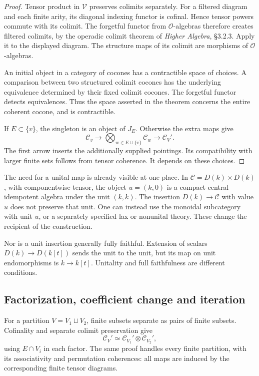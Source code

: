 \begin{proof}
Tensor product in \(\mathcal V\) preserves colimits separately.
For a filtered diagram and each finite arity, its diagonal indexing
functor is cofinal. Hence tensor powers commute with its colimit.
The forgetful functor from \(\mathcal O\)-algebras therefore creates
filtered colimits, by the operadic colimit theorem
of \emph{Higher Algebra}, \S3.2.3.
Apply it to the displayed diagram. The structure maps of its colimit
are morphisms of \(\mathcal O\)-algebras.

An initial object in a category of cocones has a contractible space
of choices. A comparison between two structured colimit cocones
has the underlying equivalence determined by their fixed colimit
cocones. The forgetful functor detects equivalences.
Thus the space asserted in the theorem concerns the entire
coherent cocone, and is contractible.

If \(E\subset\{v\}\), the singleton is an object of \(J_E\).
Otherwise the extra maps give
\[
 \mathcal C_v\longrightarrow
 \bigotimes_{w\in E\cup\{v\}}\mathcal C_w
 \longrightarrow\mathcal C_V'.
\]
The first arrow inserts the additionally supplied pointings.
Its compatibility with larger finite sets follows from tensor
coherence. It depends on these choices.
\end{proof}

The need for a unital map is already visible at one place.
In \(\mathcal C=D(k)\times D(k)\), with componentwise tensor,
the object \(u=(k,0)\) is a compact central idempotent algebra
under the unit \((k,k)\). The insertion \(D(k)\to\mathcal C\)
with value \(u\) does not preserve that unit.
One can instead use the monoidal subcategory with unit \(u\),
or a separately specified lax or nonunital theory.
These change the recipient of the construction.

Nor is a unit insertion generally fully faithful.
Extension of scalars \(D(k)\to D(k[t])\) sends the unit to the
unit, but its map on unit endomorphisms is \(k\to k[t]\).
Unitality and full faithfulness are different conditions.

\subsection{Factorization, coefficient change and iteration}

For a partition \(V=V_1\sqcup V_2\), finite subsets separate as pairs
of finite subsets. Cofinality and separate colimit preservation give
\[
 \mathcal C_V'\simeq
 \mathcal C_{V_1}'\otimes\mathcal C_{V_2}',
\]
using \(E\cap V_i\) in each factor.
The same proof handles every finite partition, with its associativity
and permutation coherences: all maps are induced by the corresponding
finite tensor diagrams.

